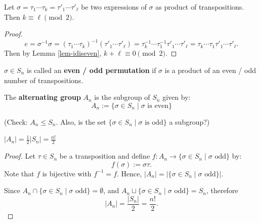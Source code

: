 \begin{proposition}
Let $\sigma = \tau_1 \cdots \tau_k = \tau'_1 \cdots \tau'_\ell$ be two expressions of $\sigma$ as product of transpositions. Then $k \equiv \ell \pmod 2$.
\end{proposition}

\begin{proof}
$$e = \sigma^{-1} \sigma = (\tau_1 \cdots \tau_k)^{-1} (\tau'_1 \cdots \tau'_\ell) = \tau_k^{-1} \cdots \tau_1^{-1} \tau'_1 \cdots \tau'_\ell = \tau_k \cdots \tau_1 \tau'_1 \cdots \tau'_\ell.$$
Then by Lemma \ref{lem-idiseven}, $k + \ell \equiv 0 \pmod 2$.
\end{proof}

\begin{definition}
$\sigma \in S_n$ is called an \textbf{even / odd permutation} if $\sigma$ is a product of an even / odd number of transpositions.
\end{definition}

\begin{definition}
The \textbf{alternating group} $A_n$ is the subgroup of $S_n$ given by:
\[ A_n := \{ \sigma \in S_n \mid \sigma \text{ is even} \} \]
\end{definition}
\noindent (Check: $A_n \le S_n$. Also, is the set $\{ \sigma \in S_n \mid \sigma \text{ is odd} \}$ a subgroup?)

\begin{proposition}
$|A_n| = \frac{1}{2} |S_n| = \frac{n!}{2}$
\end{proposition}

\begin{proof}
Let $\tau \in S_n$ be a transposition and define $f : A_n \to \{ \sigma \in S_n \mid \sigma \text{ odd} \}$ by:
$$f(\sigma) := \sigma \tau.$$ 
Note that $f$ is bijective with $f^{-1} = f$. Hence, $|A_n| = |\{ \sigma \in S_n \mid \sigma \text{ odd} \}|$. 

Since $A_n \cap \{ \sigma \in S_n \mid \sigma \text{ odd} \} = \emptyset$, and
$A_n \sqcup \{ \sigma \in S_n \mid \sigma \text{ odd} \} = S_n$, therefore $$|A_n| = \frac{|S_n|}{2} = \frac{n!}{2}.$$ 
\end{proof}

